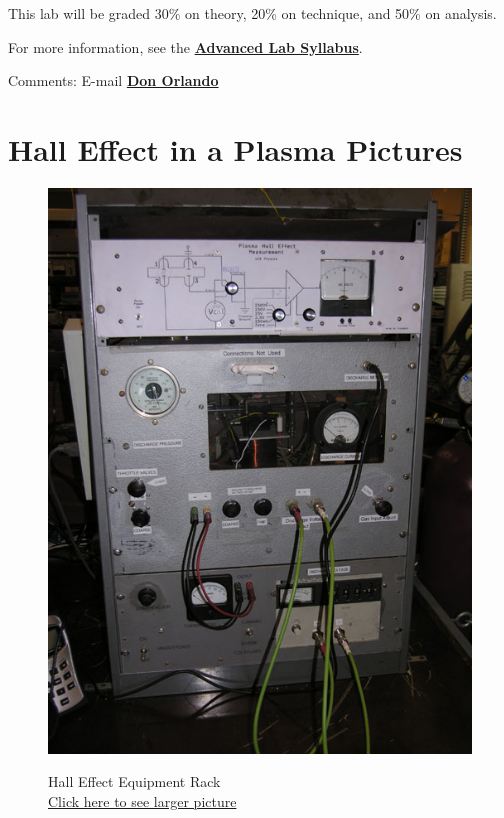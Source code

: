 \documentclass{../lab}
\begin{document}
This lab will be graded 30\% on theory, 20\% on technique, and 50\% on analysis.

For more information, see the \href{\AdvancedLabSyllabus}{\textbf{Advanced Lab Syllabus}}.

Comments: E-mail \href{\MailDonOrlando}{\textbf{Don Orlando}}

\section{Hall Effect in a Plasma Pictures}
\noindent
\begin{figure}[!htb]
  \href{http://experimentationlab.berkeley.edu/sites/default/files/images/HAL_0153B.jpg}{\includegraphics[width=\linewidth,keepaspectratio]{images/HAL_0153B.jpg}}
  \caption{Hall Effect Equipment Rack \\ \href{http://experimentationlab.berkeley.edu/sites/default/files/images/HAL_0153B.jpg}{Click here to see larger picture}}

\end{figure}
\end{document}
